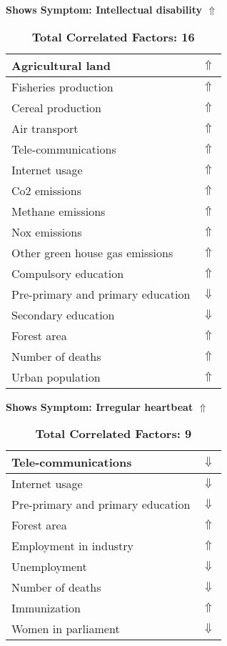 \documentclass[12pt,notitlepage,oneside]{report}
\begin{document}
\begin{table}[!htb]
\caption{\textbf{Shows Symptom: Intellectual disability $\Uparrow$}}
\centering
\label{Correlated Socio-economic Factors0}
\begin{tabular}{|l|l|}
\hline
Agricultural land & $\Uparrow$\\ \hline
Fisheries production & $\Uparrow$\\ \hline
Cereal production & $\Uparrow$\\ \hline
Air transport  & $\Uparrow$\\ \hline
Tele-communications & $\Uparrow$\\ \hline
Internet usage & $\Uparrow$\\ \hline
Co2 emissions & $\Uparrow$\\ \hline
Methane emissions & $\Uparrow$\\ \hline
Nox emissions & $\Uparrow$\\ \hline
Other green house gas emissions & $\Uparrow$\\ \hline
Compulsory education & $\Uparrow$\\ \hline
Pre-primary and primary education & $\Downarrow$\\ \hline
Secondary education & $\Downarrow$\\ \hline
Forest area & $\Uparrow$\\ \hline
Number of deaths & $\Uparrow$\\ \hline
Urban population & $\Uparrow$\\ \hline
\end{tabular}
\caption*{\textbf{Total Correlated Factors: 16}}
\end{table}
\begin{table}[!htb]
\caption{\textbf{Shows Symptom: Irregular heartbeat $\Uparrow$}}
\centering
\label{Correlated Socio-economic Factors0}
\begin{tabular}{|l|l|}
\hline
Tele-communications & $\Downarrow$\\ \hline
Internet usage & $\Downarrow$\\ \hline
Pre-primary and primary education & $\Downarrow$\\ \hline
Forest area & $\Uparrow$\\ \hline
Employment in industry & $\Uparrow$\\ \hline
Unemployment & $\Downarrow$\\ \hline
Number of deaths & $\Downarrow$\\ \hline
Immunization & $\Uparrow$\\ \hline
Women in parliament & $\Downarrow$\\ \hline
\end{tabular}
\caption*{\textbf{Total Correlated Factors: 9}}
\end{table}
\end{document}
